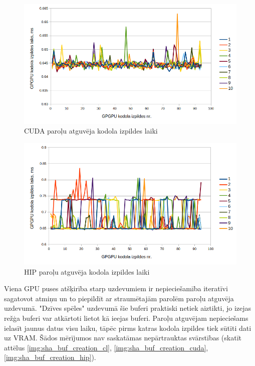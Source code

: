 \begin{figure}[H] \centering
    \includegraphics[width=\textwidth]{images/sha_kernel_exec_cuda.png}
    \caption{CUDA paroļu atguvēja kodola izpildes laiki}
    \label{img:sha_exec_cuda}
\end{figure}

\begin{figure}[H] \centering
    \includegraphics[width=\textwidth]{images/sha_kernel_exec_hip.png}
    \caption{HIP paroļu atguvēja kodola izpildes laiki}
    \label{img:sha_exec_hip}
\end{figure}


Viena GPU puses atšķirība starp uzdevumiem ir nepieciešamība iteratīvi
sagatovot atmiņu un to piepildīt ar straumētajām parolēm paroļu atguvēja
uzdevumā. "Dzīves spēles" uzdevumā šie buferi praktiski netiek aiztikti, jo
izejas režģa buferi var atkārtoti lietot kā ieejas buferi. Paroļu atguvējam
nepieciešams ielasīt jaunus datus visu laiku, tāpēc pirms katras kodola
izpildes tiek sūtīti dati uz VRAM. Šādos mērījumos nav saskatāmas nepārtrauktas
svārstības (skatīt attēlus
\ref{img:sha_buf_creation_cl}, \ref{img:sha_buf_creation_cuda},
\ref{img:sha_buf_creation_hip}).



